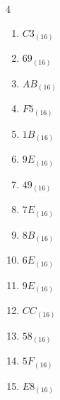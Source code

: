 \begin{multicols}{4}
\begin{enumerate}
        \phantom{$=173$}

  \item $C3_{(16)}$

        \phantom{$=195$}

  \item $69_{(16)}$

        \phantom{$=105$}

\columnbreak %

  \item $AB_{(16)}$

        \phantom{$=171$}

  \item $F5_{(16)}$

        \phantom{$=245$}

  \item $1B_{(16)}$

        \phantom{$=27$}

  \item $9E_{(16)}$

        \phantom{$=158$}

  \item $49_{(16)}$

        \phantom{$=73$}

  \item $7E_{(16)}$

        \phantom{$=126$}

  \item $8B_{(16)}$

        \phantom{$=139$}

  \item $6E_{(16)}$

        \phantom{$=110$}

  \item $9E_{(16)}$

        \phantom{$=158$}

  \item $CC_{(16)}$

        \phantom{$=204$}

  \item $58_{(16)}$

        \phantom{$=88$}

  \item $5F_{(16)}$

        \phantom{$=95$}

  \item $E8_{(16)}$

        \phantom{$=232$}


\end{enumerate}
\end{multicols}
